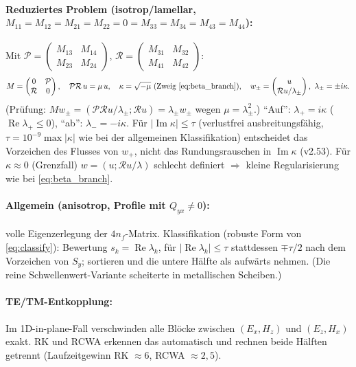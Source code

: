 \paragraph{Reduziertes Problem (isotrop/lamellar, $M_{11}=M_{12}=M_{21}=M_{22}=0=M_{33}=M_{34}=M_{43}=M_{44}$):}
Mit $\mathcal P=\begin{pmatrix}M_{13}&M_{14}\\M_{23}&M_{24}\end{pmatrix}$, $\mathcal R=\begin{pmatrix}M_{31}&M_{32}\\M_{41}&M_{42}\end{pmatrix}$:
\begin{equation}
  M=\begin{pmatrix}0&\mathcal P\\\mathcal R&0\end{pmatrix},\quad
  \mathcal P\mathcal R\,u=\mu\,u,\quad \kappa=\sqrt{-\mu}\ (\text{Zweig \eqref{eq:beta_branch}}),\quad
  w_\pm=\begin{pmatrix}u\\\mathcal Ru/\lambda_\pm\end{pmatrix},\ \lambda_\pm=\pm i\kappa .
  \label{eq:rcwa_reduced}
\end{equation}
(Prüfung: $Mw_\pm=(\mathcal P\mathcal Ru/\lambda_\pm;\mathcal Ru)=\lambda_\pm w_\pm$ wegen $\mu=\lambda_\pm^2$.)
\enquote{Auf}: $\lambda_+=i\kappa$ ($\operatorname{Re}\lambda_+\le0$), \enquote{ab}: $\lambda_-=-i\kappa$. Für
$|\operatorname{Im}\kappa|\le\tau$ (verlustfrei ausbreitungsfähig, $\tau=10^{-9}\max|\kappa|$ wie bei der allgemeinen
Klassifikation) entscheidet das Vorzeichen des Flusses von $w_+$, nicht das Rundungsrauschen in $\operatorname{Im}\kappa$
(v2.53).
Für $\kappa\approx0$ (Grenzfall) $w=(u;\mathcal Ru/\lambda)$ schlecht definiert $\Rightarrow$ kleine
Regularisierung wie bei \eqref{eq:beta_branch}.
\paragraph{Allgemein (anisotrop, Profile mit $Q_{yx}\neq0$):} volle Eigenzerlegung der $4n_f$-Matrix.
Klassifikation (robuste Form von \eqref{eq:classify}): Bewertung $s_k=\operatorname{Re}\lambda_k$, für
$|\operatorname{Re}\lambda_k|\le\tau$ stattdessen $\mp\tau/2$ nach dem Vorzeichen von $S_y$; sortieren und die untere
Hälfte als aufwärts nehmen. (Die reine Schwellenwert-Variante scheiterte in metallischen Scheiben.)
\paragraph{TE/TM-Entkopplung:} Im 1D-in-plane-Fall verschwinden alle Blöcke zwischen $(E_x,H_z)$ und
$(E_z,H_x)$ exakt. RK und RCWA erkennen das automatisch und rechnen beide Hälften getrennt
(Laufzeitgewinn RK $\approx6$, RCWA $\approx2{,}5$).


